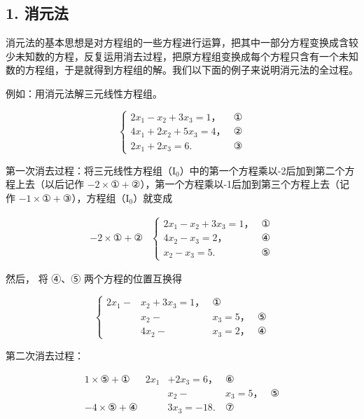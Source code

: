 \subsection{1. 消元法}

消元法的基本思想是对方程组的一些方程进行运算，把其中一部分方程变换成含较少未知数的方程，反复运用消去过程，把原方程组变换成每个方程只含有一个未知数的方程组，于是就得到方程组的解。我们以下面的例子来说明消元法的全过程。

例如：用消元法解三元线性方程组。

\[
\left\{ \begin{array}{ll} 2 x _ {1} - x _ {2} + 3 x _ {3} = 1\text{，} & ① \\ 4 x _ {1} + 2 x _ {2} + 5 x _ {3} = 4\text{，} & ② \\ 2 x _ {1} + 2 x _ {3} = 6. & ③ \end{array} \right. \tag{I₀}
\]

第一次消去过程：将三元线性方程组（\(\mathrm{I}_0\)）中的第一个方程乘以-2后加到第二个方程上去（以后记作
\(-2 \times ① + ②\)），第一个方程乘以-1后加到第三个方程上去（记作
\(-1 \times ① + ③\)），方程组（\(\mathrm{I}_0\)）就变成

\[
\left. \begin{array}{ll} - 2 \times ① + ② & \left\{ \begin{array}{ll} 2 x _ {1} - x _ {2} + 3 x _ {3} = 1\text{，} & ① \\ 4 x _ {2} - x _ {3} = 2\text{，} & ④ \\ x _ {2} - x _ {3} = 5. & ⑤ \end{array} \right. \end{array} \right. \tag{I₁}
\]

然后， 将 ④、⑤ 两个方程的位置互换得

\[
\left\{ \begin{array}{cccc} 2 x _ {1} - & x _ {2} + 3 x _ {3} = 1\text{，} & ① \\ & x _ {2} - & x _ {3} = 5\text{，} & ⑤ \\ & 4 x _ {2} - & x _ {3} = 2\text{，} & ④ \end{array} \right. \tag {I}
\]

第二次消去过程：

\[
\begin{array}{ccccc} 1 \times ⑤ + ① & 2 x _ {1} & + 2 x _ {3} = 6\text{，} & ⑥ \\ & & x _ {2} - & x _ {3} = 5\text{，} & ⑤ \\ - 4 \times ⑤ + ④ & & 3 x _ {3} = - 18. & ⑦ \end{array} \tag{II₁}
\]

